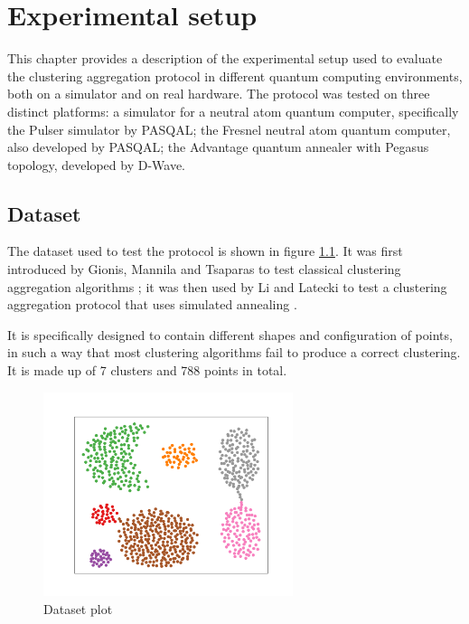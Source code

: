 \chapter{Experimental setup}
This chapter provides a description of the experimental setup used to evaluate the clustering aggregation protocol in different quantum computing environments, both on a simulator and on real hardware. The protocol was tested on three distinct platforms: a simulator for a neutral atom quantum computer, specifically the Pulser simulator by PASQAL; the Fresnel neutral atom quantum computer, also developed by PASQAL; the Advantage quantum annealer with Pegasus topology, developed by D-Wave.



\section{Dataset}
\label{sec:dataset}
The dataset used to test the protocol is shown in figure \ref{fig:dataset}. It was first introduced by Gionis, Mannila and Tsaparas to test classical clustering aggregation algorithms \cite{dataset}; it was then used by Li and Latecki to test a clustering aggregation protocol that uses simulated annealing \cite{aggregation}.

It is specifically designed to contain different shapes and configuration of points, in such a way that most clustering algorithms fail to produce a correct clustering. It is made up of 7 clusters and 788 points in total.

\begin{figure}[ht!]
  \centering 
  \includegraphics[width=0.65\textwidth]{figures/03experimental_setup/dataset.pdf}
  \caption{Dataset plot}
  \label{fig:dataset}
\end{figure}


